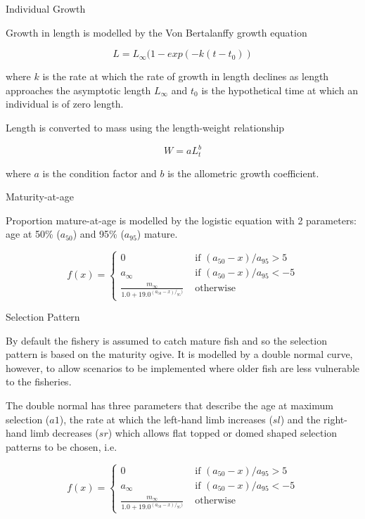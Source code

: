 \documentclass[preprint,12pt]{elsarticle}
\begin{document}
Individual Growth

Growth in length is modelled by the Von Bertalanffy growth equation \cite{vonbert1957quantitative}

\begin{equation} L = L_\infty(1 - exp(-k(t-t_0)) \end{equation}
         
where $k$ is the rate at which the rate of growth in length declines as length approaches the asymptotic length  $L_\infty$ and $t_{0}$ is the hypothetical time at which an individual is of zero length.

Length is converted to mass using the length-weight relationship 
    
\begin{equation} W = aL_t^b \end{equation}

\noindent where $a$ is the condition factor and $b$ is the allometric growth coefficient.


Maturity-at-age

Proportion mature-at-age is modelled by the logistic equation with 2 parameters: age at 50\% ($a_{50}$) and 95\% ($a_{95}$) mature.

\begin{equation}
f(x) = \left\{ \begin{array}{ll}
			0                                 &\mbox{ if $(a_{50}-x)/a_{95} >  5$} \\
			a_{\infty}                        &\mbox{ if $(a_{50}-x)/a_{95} < -5$} \\
			\frac{m_{\infty}}{1.0+19.0^{(a_{50}-x)/_{95})}} &\mbox{ otherwise}
		\end{array}
       \right.
\end{equation}

Selection Pattern

By default the fishery is assumed to catch mature fish and so the selection pattern is based on the maturity ogive. It is modelled by a double normal curve, however, to allow scenarios to be implemented where older fish are less vulnerable to the fisheries.    

The double normal has three parameters that describe the age at maximum selection ($a1$), the rate at which the left-hand  limb increases ($sl$) and the right-hand limb decreases ($sr$) which allows flat topped or domed shaped selection patterns to be chosen, i.e.
         
\begin{equation}
f(x) = \left\{ \begin{array}{ll}
			0                                 &\mbox{ if $(a_{50}-x)/a_{95} >  5$} \\
			a_\infty                        &\mbox{ if $(a_{50}-x)/a_{95} < -5$} \\
			\frac{m_\infty}{1.0+19.0^{(a_{50}-x)/_{95})}} &\mbox{ otherwise}
		\end{array}
       \right.
\end{equation}
\end{document}
